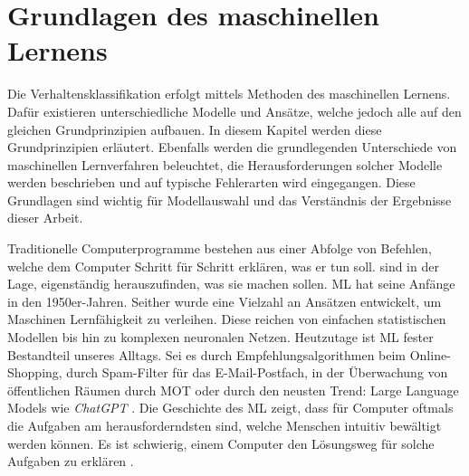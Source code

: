 \section{Grundlagen des maschinellen Lernens} \label{sec:Grundlagen ML}

Die Verhaltensklassifikation erfolgt mittels Methoden des maschinellen Lernens. Dafür existieren unterschiedliche Modelle und Ansätze, welche jedoch alle auf den gleichen Grundprinzipien aufbauen. In diesem Kapitel werden diese Grundprinzipien erläutert. Ebenfalls werden die grundlegenden Unterschiede von maschinellen Lernverfahren beleuchtet, die Herausforderungen solcher Modelle werden beschrieben und auf typische Fehlerarten wird eingegangen. Diese Grundlagen sind wichtig für Modellauswahl und das Verständnis der Ergebnisse dieser Arbeit.

Traditionelle Computerprogramme bestehen aus einer Abfolge von Befehlen, welche dem Computer Schritt für Schritt erklären, was er tun soll.  sind in der Lage, eigenständig herauszufinden, was sie machen sollen. \Gls{ML} hat seine Anfänge in den 1950er-Jahren. Seither wurde eine Vielzahl an Ansätzen entwickelt, um Maschinen Lernfähigkeit zu verleihen. Diese reichen von einfachen statistischen Modellen bis hin zu komplexen neuronalen Netzen. Heutzutage ist \gls{ML} fester Bestandteil unseres Alltags. Sei es durch Empfehlungsalgorithmen beim Online-Shopping, durch Spam-Filter für das E-Mail-Postfach, in der Überwachung von öffentlichen Räumen durch \gls{MOT} oder durch den neusten Trend: Large Language Models wie \textit{ChatGPT} \cite{Domingos.2015, Liu.2023}. Die Geschichte des \gls{ML} zeigt, dass für Computer oftmals die Aufgaben am herausforderndsten sind, welche Menschen intuitiv bewältigt werden können. Es ist schwierig, einem Computer den Lösungsweg für solche Aufgaben zu erklären \cite{Goodfellow.2016}. \par

